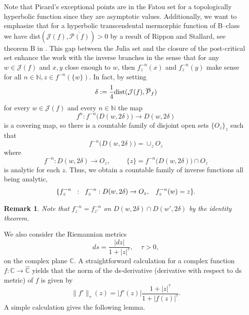 \documentclass[12pt,reqno]{amsart}
\newtheorem{remark}[theorem]{Remark}
\begin{document}
\noindent Note that Picard's exceptional points are in the Fatou set for a topologically hyperbolic function since they are asymptotic values. Additionally, we want to emphasize that for a hyperbolic transcendental mermorphic function of B--class we have dist$(\mathcal{J}(f), \overline{\mathcal{P}(f)})>0$ by a result of Rippon and Stallard, see theorem B in \citep{stallard}. This gap between the Julia set and the closure of the post-critical set enhance the work with the inverse branches in the sense that for any $w \in \mathcal{J}(f)$ and $x,y$ close enough to $w$, then $f_z^{-n}(x)$ and $f_z^{-n}(y)$ make sense for all $n \in \mathbb{N}, z \in f^{-n}(\{w\})$. In fact, by setting 
\begin{equation}\label{delta}
    \delta:=\frac{1}{4}\textup{dist}(\mathcal{J}(f),\overline{\mathcal{P}}_f)
\end{equation}
for every $w \in \mathcal{J}(f)$ and every $n \in \mathbb{N}$ the map 
$$f^n : f^{-n}\big( D(w,2\delta) \big) \to D(w,2\delta)$$ 
is a covering map, so there is a countable family of disjoint open sets $\{ O_z\}_z$ such that 
$$f^{-n}\big( D(w,2\delta) \big)=\cup_{z} O_z$$
where 
$$f^{-n}: D(w,2\delta) \to O_z, \hspace{1cm} \{z\}=f^{-n}\big( D(w,2\delta) \big) \cap O_z$$
is analytic for each $z$. Thus, we obtain a countable family of inverse functions all being analytic,
$$\{f_z^{-n} \hspace{2mm}: \hspace{2mm} f_z^{-n}: D(w,2\delta) \to O_z, \hspace{3mm}  f_z^{-n}(w)=z  \}.$$
\begin{remark}\label{f_z=f_z'}
    Note that $f_z^{-n}=f_{z'}^{-n}$ on $D(w,2\delta) \cap D(w',2\delta)$ by the identity theorem.
\end{remark}

\noindent We also consider the Riemannian metrics
$$ds=\frac{|dz|}{1+|z|^{\tau}}, \; \; \; \; \tau>0,$$
on the complex plane $\mathbb{C}$. A straightforward calculation for a complex function $f: \mathbb{C} \to \hat{\mathbb{C}}$  yields that the norm of the ds-derivative (derivative with respect to ds metric) of $f$ is given by
$$\| f' \|_{\tau}(z)=|f'(z)|\dfrac{1+|z|^{\tau}}{1+|f(z)|^{\tau}}.$$
A simple calculation gives the following lemma.
\end{document}
